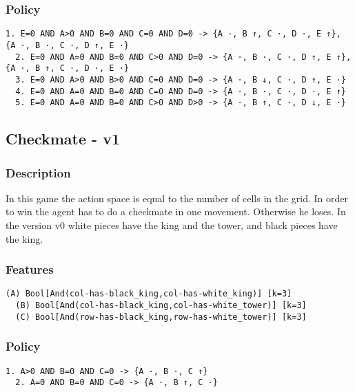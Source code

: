 \documentclass[a4paper]{article}
\begin{document}
\subsubsection{Policy}
\begin{Verbatim}[fontsize=\footnotesize]
  1. E=0 AND A>0 AND B=0 AND C=0 AND D=0 -> {A ·, B ↑, C ·, D ·, E ↑}, {A ·, B ·, C ·, D ↑, E ·}
  2. E=0 AND A=0 AND B=0 AND C>0 AND D=0 -> {A ·, B ·, C ·, D ↑, E ↑}, {A ·, B ↑, C ·, D ·, E ·}
  3. E=0 AND A>0 AND B>0 AND C=0 AND D=0 -> {A ·, B ↓, C ·, D ↑, E ·}
  4. E=0 AND A=0 AND B=0 AND C=0 AND D=0 -> {A ·, B ·, C ·, D ·, E ↑}
  5. E=0 AND A=0 AND B=0 AND C>0 AND D>0 -> {A ·, B ↑, C ·, D ↓, E ·}

\end{Verbatim}

\subsection{Checkmate - v1}
\subsubsection{Description}
In this game the action space is equal to the number of cells in the grid. In order to win the agent has to do a checkmate in one movement. Otherwise he loses. In the version v0 white pieces have the king and the tower, and black pieces have the king.

\subsubsection{Features}
\begin{Verbatim}[fontsize=\footnotesize]
  (A) Bool[And(col-has-black_king,col-has-white_king)] [k=3]
  (B) Bool[And(col-has-black_king,col-has-white_tower)] [k=3]
  (C) Bool[And(row-has-black_king,row-has-white_tower)] [k=3]

\end{Verbatim}

\subsubsection{Policy}
\begin{Verbatim}[fontsize=\footnotesize]
  1. A>0 AND B=0 AND C=0 -> {A ·, B ·, C ↑}
  2. A=0 AND B=0 AND C=0 -> {A ·, B ↑, C ·}

\end{Verbatim}

\newpage
\end{document}
